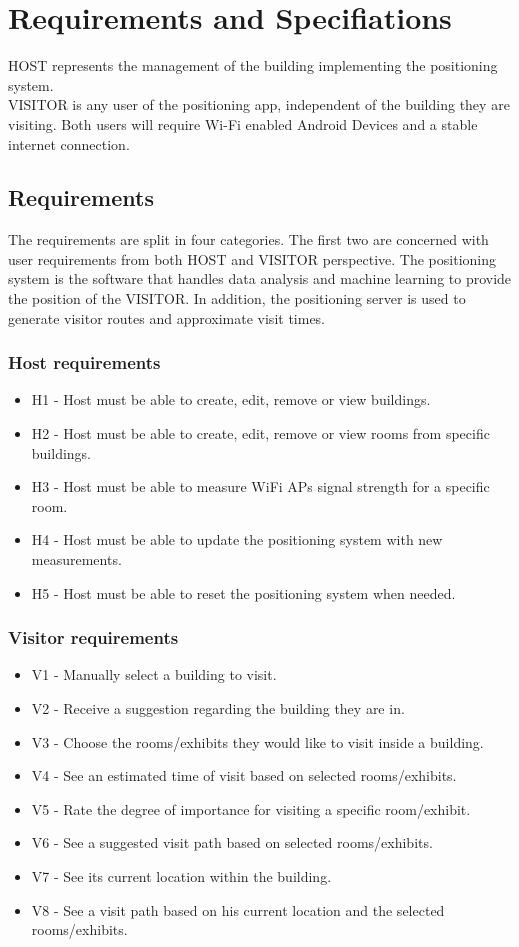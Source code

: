 \chapter{Requirements and Specifiations}
HOST represents the management of the building implementing the positioning system.\\ 
VISITOR is any user of the positioning app, independent of the building they are visiting.
Both users will require Wi-Fi enabled Android Devices and a stable internet connection. 

\section{Requirements}
The requirements are split in four categories. The first two are concerned with user requirements from both HOST and VISITOR perspective. The positioning system is the software that handles data analysis and machine learning to provide the position of the VISITOR. In addition, the positioning server is used to generate visitor routes and approximate visit times.

\subsection{Host requirements}
	\begin{itemize}
		\item H1 - Host must be able to create, edit, remove or view buildings.
		\item H2 - Host must be able to create, edit, remove or view rooms from specific buildings.
		\item H3 - Host must be able to measure WiFi APs signal strength for a specific room.
		\item H4 - Host must be able to update the positioning system with new measurements.
		\item H5 - Host must be able to reset the positioning system when needed.
	\end{itemize}

\subsection{Visitor requirements}
	\begin{itemize}
		\item V1 - Manually select a building to visit.
		\item V2 - Receive a suggestion regarding the building they are in.
		\item V3 - Choose the rooms/exhibits they would like to visit inside a building.
		\item V4 - See an estimated time of visit based on selected rooms/exhibits.
		\item V5 - Rate the degree of importance for visiting a specific room/exhibit.
		\item V6 - See a suggested visit path based on selected rooms/exhibits.
		\item V7 - See its current location within the building.
		\item V8 - See a visit path based on his current location and the selected rooms/exhibits.
	\end{itemize}

